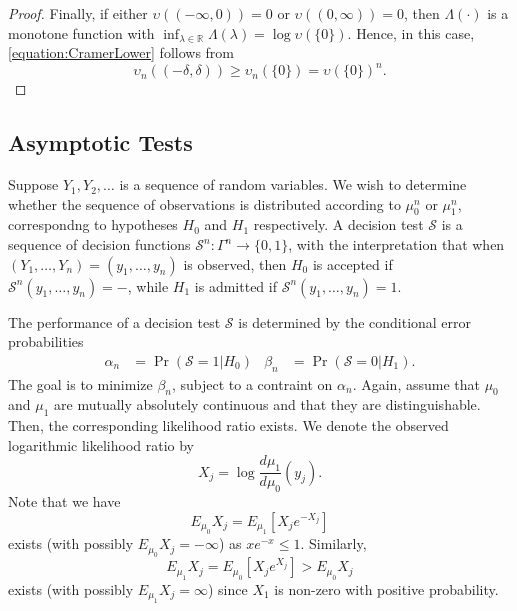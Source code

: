 \begin{proof}
Finally, if either $\upsilon ((-\infty, 0)) = 0$ or $\upsilon ((0, \infty)) = 0$, then $\Lambda(\cdot)$ is a monotone function with $\inf_{\lambda \in \mathbb{R}} \Lambda (\lambda) = \log \upsilon (\{ 0 \})$.
Hence, in this case, \eqref{equation:CramerLower} follows from
\begin{equation*}
\upsilon_n ((-\delta,\delta)) \geq \upsilon_n(\{0\}) = \upsilon (\{0\})^n .
\end{equation*}
\end{proof}

\subsection{Asymptotic Tests}

Suppose $Y_1, Y_2, \ldots$ is a sequence of random variables.
We wish to determine whether the sequence of observations is distributed according to $\mu_0^n$ or $\mu_1^n$, correspondng to hypotheses $H_0$ and $H_1$ respectively.
A decision test $\mathcal{S}$ is a sequence of decision functions $\mathcal{S}^n : \Gamma^n \rightarrow \{ 0, 1 \}$, with the interpretation that when $(Y_1, \ldots, Y_n) = (y_1, \ldots, y_n)$ is observed, then $H_0$ is accepted if $\mathcal{S}^n (y_1, \ldots, y_n) = -$, while $H_1$ is admitted if $\mathcal{S}^n (y_1, \ldots, y_n) = 1$.

The performance of a decision test $\mathcal{S}$ is determined by the conditional error probabilities
\begin{align*}
\alpha_n &= \Pr (\mathcal{S} = 1 | H_0) &
\beta_n &= \Pr (\mathcal{S} = 0 | H_1) .
\end{align*}
The goal is to minimize $\beta_n$, subject to a contraint on $\alpha_n$.
Again, assume that $\mu_0$ and $\mu_1$ are mutually absolutely continuous and that they are distinguishable.
Then, the corresponding likelihood ratio exists.
We denote the observed logarithmic likelihood ratio by
\begin{equation*}
X_j = \log \frac{d \mu_1}{d \mu_0} (y_j) .
\end{equation*}
Note that we have
\begin{equation*}
E_{\mu_0} X_j = E_{\mu_1} \left[ X_j e^{- X_j} \right]
\end{equation*}
exists (with possibly $E_{\mu_0} X_j = - \infty$) as $xe^{-x} \leq 1$.
Similarly,
\begin{equation*}
E_{\mu_1} X_j = E_{\mu_0} \left[ X_j e^{X_j} \right] > E_{\mu_0} X_j
\end{equation*}
exists (with possibly $E_{\mu_1} X_j = \infty$) since $X_1$ is non-zero with positive probability.

